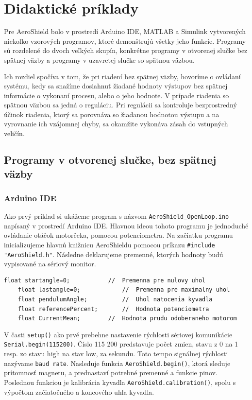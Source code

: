 \chapter{Didaktické príklady}
\label{Didaktické príklady}

Pre AeroShield bolo v prostredí Arduino IDE, MATLAB a Simulink vytvorených niekoľko vzorových programov, ktoré demonštrujú všetky jeho funkcie. Programy sú rozdelené do dvoch veľkých skupín, konkrétne programy v otvorenej slučke bez spätnej väzby a programy v uzavretej slučke so spätnou väzbou. 

Ich rozdiel spočíva v tom, že pri riadení bez spätnej väzby, hovoríme o ovládaní systému, kedy sa snažíme dosiahnuť žiadané hodnoty výstupov bez spätnej informácie o vykonaní procesu, alebo o jeho hodnote. V prípade riadenia so spätnou väzbou sa jedná o reguláciu. Pri regulácii sa kontroluje bezprostredný účinok riadenia, ktorý sa porovnáva so žiadanou hodnotou výstupu a na vyrovnanie ich vzájomnej chyby, sa okamžite vykonáva zásah do vstupných veličín. 

\section{Programy v otvorenej slučke, bez spätnej väzby}
\subsection{Arduino IDE}
\label{bezspatnej}

Ako prvý príklad si ukážeme program s názvom \verb|AeroShield_OpenLoop.ino| napísaný v prostredí Arduino IDE. Hlavnou ideou tohoto programu je jednoduché ovládanie otáčok motorčeka, pomocou potenciometra. Na začiatku programu inicializujeme hlavnú knižnicu AeroShieldu pomocou príkazu \verb|#include "AeroShield.h"|. Následne deklarujeme premenné, ktorých hodnoty budú vypisované na sériový monitor. 

\begin{lstlisting}[caption={AeroShield open loop dekleracia.},captionpos=b]
	float startangle=0;           //  Premenna pre nulovy uhol
	float lastangle=0;            //  Premenna pre maximalny uhol 
	float pendulumAngle;          //  Uhol natocenia kyvadla
	float referencePercent;       //  Hodnota potenciometra
	float CurrentMean;	      //  Hodnota prudu odoberaneho motorom 
\end{lstlisting}

V časti \verb|setup()| ako prvé prebehne nastavenie rýchlosti sériovej komunikácie \verb|Serial.begin(115200)|. Číslo 115 200 predstavuje počet zmien, stavu z 0 na 1 resp. zo stavu high na stav low, za sekundu. Toto tempo signálnej rýchlosti nazývame \verb|baud rate|. Nasleduje funkcia \verb|AeroShield.begin()|, ktorá sleduje prítomnosť magnetu, a prednastaví potrebné premenné a funkcie pinov. Poslednou funkciou je kalibrácia kyvadla \verb|AeroShield.calibration()|, spolu s výpočtom začiatočného a koncového uhla kyvadla. 

